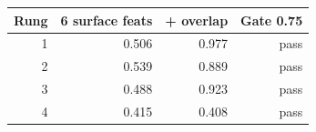 \begin{tabular}{rrrr}
\hline
Rung & 6 surface feats & + overlap & Gate 0.75 \\
\hline
1 & 0.506 & 0.977 & pass \\
2 & 0.539 & 0.889 & pass \\
3 & 0.488 & 0.923 & pass \\
4 & 0.415 & 0.408 & pass \\
\hline
\end{tabular}

